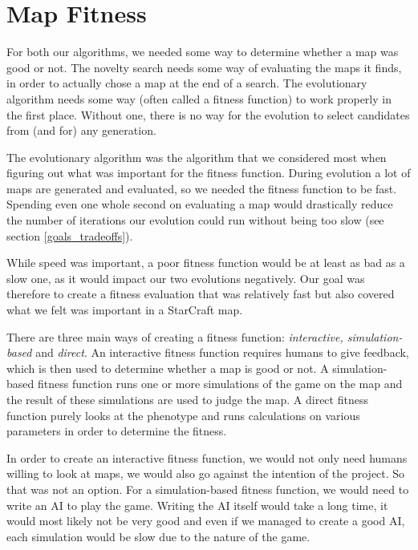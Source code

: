 \section{Map Fitness}
\label{methodology_mapfitness}

For both our algorithms, we needed some way to determine whether a map was good or not. The novelty search needs some way of evaluating the maps it finds, in order to actually chose a map at the end of a search. The evolutionary algorithm needs some way (often called a fitness function) to work properly in the first place. Without one, there is no way for the evolution to select candidates from (and for) any generation.

The evolutionary algorithm was the algorithm that we considered most when figuring out what was important for the fitness function. During evolution a lot of maps are generated and evaluated, so we needed the fitness function to be fast. Spending even one whole second on evaluating a map would drastically reduce the number of iterations our evolution could run without being too slow (see section \ref{goals_tradeoffs}).

While speed was important, a poor fitness function would be at least as bad as a slow one, as it would impact our two evolutions negatively. Our goal was therefore to create a fitness evaluation that was relatively fast but also covered what we felt was important in a StarCraft map.

There are three main ways of creating a fitness function\cite{Togelius2010Multiobjective}: \textit{interactive, simulation-based} and \textit{direct}. An interactive fitness function requires humans to give feedback, which is then used to determine whether a map is good or not. A simulation-based fitness function runs one or more simulations of the game on the map and the result of these simulations are used to judge the map. A direct fitness function purely looks at the phenotype and runs calculations on various parameters in order to determine the fitness.

In order to create an interactive fitness function, we would not only need humans willing to look at maps, we would also go against the intention of the project. So that was not an option. For a simulation-based fitness function, we would need to write an AI to play the game. Writing the AI itself would take a long time, it would most likely not be very good and even if we managed to create a good AI, each simulation would be slow due to the nature of the game.

